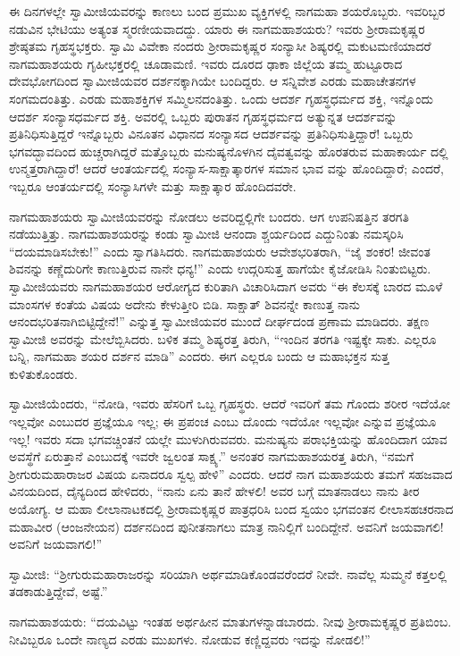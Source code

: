 ಈ ದಿನಗಳಲ್ಲೇ ಸ್ವಾಮೀಜಿಯವರನ್ನು ಕಾಣಲು ಬಂದ ಪ್ರಮುಖ ವ್ಯಕ್ತಿಗಳಲ್ಲಿ ನಾಗಮಹಾ ಶಯರೊಬ್ಬರು. ಇವರಿಬ್ಬರ ನಡುವಿನ ಭೇಟಿಯು ಅತ್ಯಂತ ಸ್ಮರಣೀಯವಾದದ್ದು. ಯಾರು ಈ ನಾಗಮಹಾಶಯರು? ಇವರು ಶ್ರೀರಾಮಕೃಷ್ಣರ ಶ್ರೇಷ್ಠತಮ ಗೃಹಸ್ಥಭಕ್ತರು. ಸ್ವಾಮಿ ವಿವೇಕಾ ನಂದರು ಶ್ರೀರಾಮಕೃಷ್ಣರ ಸಂನ್ಯಾಸೀ ಶಿಷ್ಯರಲ್ಲಿ ಮಕುಟಮಣಿಯಾದರೆ ನಾಗಮಹಾಶಯರು ಗೃಹೀಭಕ್ತರಲ್ಲಿ ಚೂಡಾಮಣಿ. ಇವರು ದೂರದ ಢಾಕಾ ಜಿಲ್ಲೆಯ ತಮ್ಮ ಹುಟ್ಟೂರಾದ ದೇವಭೋಗದಿಂದ ಸ್ವಾಮೀಜಿಯವರ ದರ್ಶನಕ್ಕಾಗಿಯೇ ಬಂದಿದ್ದರು. ಆ ಸನ್ನಿವೇಶ ಎರಡು ಮಹಾಚೇತನಗಳ ಸಂಗಮದಂತಿತ್ತು. ಎರಡು ಮಹಾಶಕ್ತಿಗಳ ಸಮ್ಮಿಲನದಂತಿತ್ತು. ಒಂದು ಆದರ್ಶ ಗೃಹಸ್ಥಧರ್ಮದ ಶಕ್ತಿ, ಇನ್ನೊಂದು ಆದರ್ಶ ಸಂನ್ಯಾಸಧರ್ಮದ ಶಕ್ತಿ. ಅವರಲ್ಲಿ ಒಬ್ಬರು ಪುರಾತನ ಗೃಹಸ್ಥಧರ್ಮದ ಅತ್ಯುನ್ನತ ಆದರ್ಶವನ್ನು ಪ್ರತಿನಿಧಿಸುತ್ತಿದ್ದರೆ ಇನ್ನೊಬ್ಬರು ವಿನೂತನ ವಿಧಾನದ ಸಂನ್ಯಾಸದ ಆದರ್ಶವನ್ನು ಪ್ರತಿನಿಧಿಸುತ್ತಿದ್ದಾರೆ! ಒಬ್ಬರು ಭಗವದ್ಭಾವದಿಂದ ಹುಚ್ಚರಾಗಿದ್ದರೆ ಮತ್ತೊಬ್ಬರು ಮನುಷ್ಯನೊಳಗಿನ ದೈವತ್ವವನ್ನು ಹೊರತರುವ ಮಹಾಕಾರ್ಯ ದಲ್ಲಿ ಉನ್ಮತ್ತರಾಗಿದ್ದಾರೆ! ಆದರೆ ಆಂತರ್ಯದಲ್ಲಿ ಸಂನ್ಯಾಸ-ಸಾಕ್ಷಾತ್ಕಾರಗಳ ಸಮಾನ ಭಾವ ವನ್ನು ಹೊಂದಿದ್ದಾರೆ; ಎಂದರೆ, ಇಬ್ಬರೂ ಆಂತರ್ಯದಲ್ಲಿ ಸಂನ್ಯಾಸಿಗಳೇ ಮತ್ತು ಸಾಕ್ಷಾತ್ಕಾರ ಹೊಂದಿದವರೇ.

ನಾಗಮಹಾಶಯರು ಸ್ವಾಮೀಜಿಯವರನ್ನು ನೋಡಲು ಅವರಿದ್ದಲ್ಲಿಗೇ ಬಂದರು. ಆಗ ಉಪನಿಷತ್ತಿನ ತರಗತಿ ನಡೆಯುತ್ತಿತ್ತು. ನಾಗಮಹಾಶಯರನ್ನು ಕಂಡು ಸ್ವಾಮೀಜಿ ಆನಂದಾ ಶ್ಚರ್ಯದಿಂದ ಎದ್ದುನಿಂತು ನಮಸ್ಕರಿಸಿ “ದಯಮಾಡಿಸಬೇಕು!” ಎಂದು ಸ್ವಾಗತಿಸಿದರು. ನಾಗಮಹಾಶಯರು ಆವೇಶಭರಿತರಾಗಿ, “ಜೈ ಶಂಕರ! ಜೀವಂತ ಶಿವನನ್ನು ಕಣ್ಣೆದುರಿಗೇ ಕಾಣುತ್ತಿರುವ ನಾನೇ ಧನ್ಯ!” ಎಂದು ಉದ್ಗರಿಸುತ್ತ ಹಾಗೆಯೇ ಕೈಜೋಡಿಸಿ ನಿಂತುಬಿಟ್ಟರು. ಸ್ವಾಮೀಜಿಯವರು ನಾಗಮಹಾಶಯರ ಆರೋಗ್ಯದ ಕುರಿತಾಗಿ ವಿಚಾರಿಸಿದಾಗ ಅವರು “ಈ ಕೆಲಸಕ್ಕೆ ಬಾರದ ಮೂಳೆ ಮಾಂಸಗಳ ಕಂತೆಯ ವಿಷಯ ಅದೇನು ಕೇಳುತ್ತೀರಿ ಬಿಡಿ. ಸಾಕ್ಷಾತ್ ಶಿವನನ್ನೇ ಕಾಣುತ್ತ ನಾನು ಆನಂದಭರಿತನಾಗಿಬಿಟ್ಟಿದ್ದೇನೆ!” ಎನ್ನುತ್ತ ಸ್ವಾಮೀಜಿಯವರ ಮುಂದೆ ದೀರ್ಘದಂಡ ಪ್ರಣಾಮ ಮಾಡಿದರು. ತಕ್ಷಣ ಸ್ವಾಮೀಜಿ ಅವರನ್ನು ಮೇಲೆಬ್ಬಿಸಿದರು. ಬಳಿಕ ತಮ್ಮ ಶಿಷ್ಯರತ್ತ ತಿರುಗಿ, “ಇಂದಿನ ತರಗತಿ ಇಷ್ಟಕ್ಕೇ ಸಾಕು. ಎಲ್ಲರೂ ಬನ್ನಿ, ನಾಗಮಹಾ ಶಯರ ದರ್ಶನ ಮಾಡಿ” ಎಂದರು. ಈಗ ಎಲ್ಲರೂ ಬಂದು ಆ ಮಹಾಭಕ್ತನ ಸುತ್ತ ಕುಳಿತುಕೊಂಡರು.

ಸ್ವಾಮೀಜಿಯೆಂದರು, “ನೋಡಿ, ಇವರು ಹೆಸರಿಗೆ ಒಬ್ಬ ಗೃಹಸ್ಥರು. ಆದರೆ ಇವರಿಗೆ ತಮ ಗೊಂದು ಶರೀರ ಇದೆಯೋ ಇಲ್ಲವೋ ಎಂಬುದರ ಪ್ರಜ್ಞೆಯೂ ಇಲ್ಲ; ಈ ಪ್ರಪಂಚ ಎಂಬು ದೊಂದು ಇದೆಯೋ ಇಲ್ಲವೋ ಎನ್ನುವ ಪ್ರಜ್ಞೆಯೂ ಇಲ್ಲ! ಇವರು ಸದಾ ಭಗವಚ್ಚಿಂತನೆ ಯಲ್ಲೇ ಮುಳುಗಿರುವವರು. ಮನುಷ್ಯನು ಪರಾಭಕ್ತಿಯನ್ನು ಹೊಂದಿದಾಗ ಯಾವ ಅವಸ್ಥೆಗೆ ಏರುತ್ತಾನೆ ಎಂಬುದಕ್ಕೆ ಇವರೇ ಜ್ವಲಂತ ಸಾಕ್ಷ್ಯ.” ಅನಂತರ ನಾಗಮಹಾಶಯರತ್ತ ತಿರುಗಿ, “ನಮಗೆ ಶ್ರೀಗುರುಮಹಾರಾಜರ ವಿಷಯ ಏನಾದರೂ ಸ್ವಲ್ಪ ಹೇಳಿ” ಎಂದರು. ಆದರೆ ನಾಗ ಮಹಾಶಯರು ತಮಗೆ ಸಹಜವಾದ ವಿನಯದಿಂದ, ದೈನ್ಯದಿಂದ ಹೇಳಿದರು, “ನಾನು ಏನು ತಾನೆ ಹೇಳಲಿ! ಅವರ ಬಗ್ಗೆ ಮಾತನಾಡಲು ನಾನು ತೀರ ಅಯೋಗ್ಯ. ಆ ಮಹಾ ಲೀಲಾನಾಟಕದಲ್ಲಿ ಶ್ರೀರಾಮಕೃಷ್ಣರ ಪಾತ್ರಧರಿಸಿ ಬಂದ ಸ್ವಯಂ ಭಗವಂತನ ಲೀಲಾಸಹಚರನಾದ ಮಹಾವೀರ (ಆಂಜನೇಯನ) ದರ್ಶನದಿಂದ ಪುನೀತನಾಗಲು ಮಾತ್ರ ನಾನಿಲ್ಲಿಗೆ ಬಂದಿದ್ದೇನೆ. ಅವನಿಗೆ ಜಯವಾಗಲಿ! ಅವನಿಗೆ ಜಯವಾಗಲಿ!”

ಸ್ವಾಮೀಜಿ: “ಶ್ರೀಗುರುಮಹಾರಾಜರನ್ನು ಸರಿಯಾಗಿ ಅರ್ಥಮಾಡಿಕೊಂಡವರೆಂದರೆ ನೀವೇ. ನಾವೆಲ್ಲ ಸುಮ್ಮನೆ ಕತ್ತಲಲ್ಲಿ ತಡಕಾಡುತ್ತಿದ್ದೇವೆ, ಅಷ್ಟೆ.”

ನಾಗಮಹಾಶಯರು: “ದಯವಿಟ್ಟು ಇಂತಹ ಅರ್ಥಹೀನ ಮಾತುಗಳನ್ನಾಡಬಾರದು. ನೀವು ಶ್ರೀರಾಮಕೃಷ್ಣರ ಪ್ರತಿಬಿಂಬ. ನೀವಿಬ್ಬರೂ ಒಂದೇ ನಾಣ್ಯದ ಎರಡು ಮುಖಗಳು. ನೋಡುವ ಕಣ್ಣಿದ್ದವರು ಇದನ್ನು ನೋಡಲಿ!”

